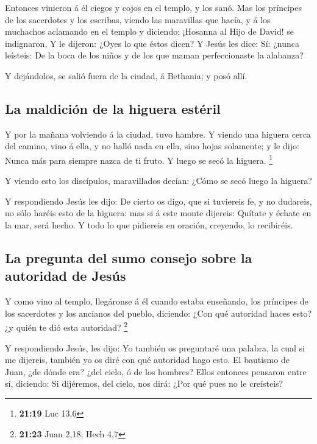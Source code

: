  Entonces vinieron á él ciegos y cojos en el templo, y
los sanó.  Mas los príncipes de los sacerdotes y los
escribas, viendo las maravillas que hacía, y á los muchachos aclamando
en el templo y diciendo: ¡Hosanna al Hijo de David! se indignaron,
 Y le dijeron: ¿Oyes lo que éstos dicen? Y Jesús les
dice: Sí: ¿nunca leísteis: De la boca de los niños y de los que maman
perfeccionaste la alabanza?

 Y dejándolos, se salió fuera de la ciudad, á Bethania; y
posó allí.

\hypertarget{la-maldiciuxf3n-de-la-higuera-estuxe9ril}{%
\subsection{La maldición de la higuera
estéril}\label{la-maldiciuxf3n-de-la-higuera-estuxe9ril}}

 Y por la mañana volviendo á la ciudad, tuvo hambre.
 Y viendo una higuera cerca del camino, vino á ella, y no
halló nada en ella, sino hojas solamente; y le dijo: Nunca más para
siempre nazca de ti fruto. Y luego se secó la higuera. \footnote{\textbf{21:19}
  Luc 13,6}

 Y viendo esto los discípulos, maravillados decían: ¿Cómo
se secó luego la higuera?

 Y respondiendo Jesús les dijo: De cierto os digo, que si
tuviereis fe, y no dudareis, no sólo haréis esto de la higuera: mas si á
este monte dijereis: Quítate y échate en la mar, será hecho.
 Y todo lo que pidiereis en oración, creyendo, lo
recibiréis.

\hypertarget{la-pregunta-del-sumo-consejo-sobre-la-autoridad-de-jesuxfas}{%
\subsection{La pregunta del sumo consejo sobre la autoridad de
Jesús}\label{la-pregunta-del-sumo-consejo-sobre-la-autoridad-de-jesuxfas}}

 Y como vino al templo, llegáronse á él cuando estaba
enseñando, los príncipes de los sacerdotes y los ancianos del pueblo,
diciendo: ¿Con qué autoridad haces esto? ¿y quién te dió esta autoridad?
\footnote{\textbf{21:23} Juan 2,18; Hech 4,7}

 Y respondiendo Jesús, les dijo: Yo también os preguntaré
una palabra, la cual si me dijereis, también yo os diré con qué
autoridad hago esto.  El bautismo de Juan, ¿de dónde era?
¿del cielo, ó de los hombres? Ellos entonces pensaron entre sí,
diciendo: Si dijéremos, del cielo, nos dirá: ¿Por qué pues no le
creísteis?

